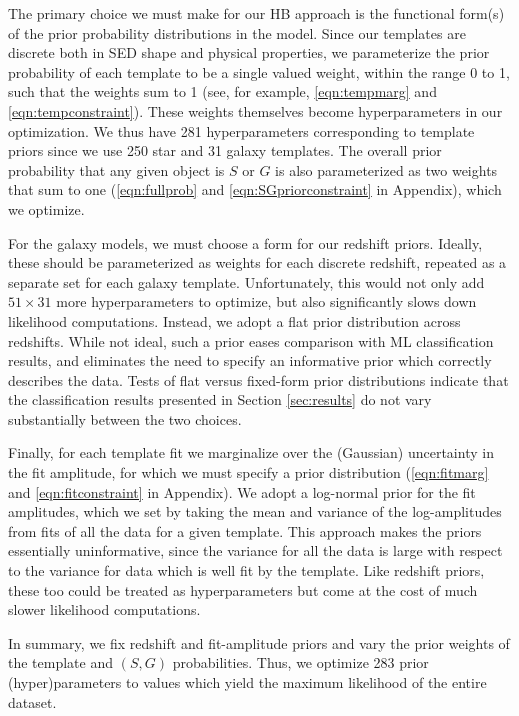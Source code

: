 \documentclass[12pt,preprint]{aastex}
\begin{document}
The primary choice we must make for our HB approach is the functional
form(s) of the prior probability distributions in the model.  Since
our templates are discrete both in SED shape and physical properties,
we parameterize the prior probability of each template to be a single
valued weight, within the range 0 to 1, such that the weights sum to
1 (see, for example, \ref{eqn:tempmarg} and \ref{eqn:tempconstraint}).  
These weights themselves become hyperparameters in our
optimization.  We thus have 281 hyperparameters corresponding to
template priors since we use 250 star and 31 galaxy templates.  The
overall prior probability that any given object is $S$ or $G$ is also
parameterized as two weights that sum to one (\ref{eqn:fullprob} and 
\ref{eqn:SGpriorconstraint} in Appendix), which we optimize.

For the galaxy models, we must choose a form for our redshift priors.  Ideally,
these should be parameterized as weights for each discrete redshift,
repeated as a separate set for each galaxy template.  Unfortunately,
this would not only add $51\times31$ more hyperparameters to optimize,
but also significantly slows down likelihood computations.  Instead,
we adopt a flat prior distribution across redshifts.  While not ideal,
such a prior eases comparison with ML classification results, and
eliminates the need to specify an informative prior which correctly
describes the data.  Tests of flat versus fixed-form prior
distributions indicate that the classification results presented in
Section \ref{sec:results} do not vary substantially between the two
choices.  

Finally, for each template fit we marginalize over the (Gaussian) uncertainty 
in the fit amplitude, for which we must specify a prior distribution 
(\ref{eqn:fitmarg} and \ref{eqn:fitconstraint} in Appendix).  We adopt a log-normal 
prior for the fit amplitudes, which we set by taking the mean and variance 
of the log-amplitudes from fits of all the data for a given template.  This approach makes 
the priors essentially uninformative, since the variance for all the data is 
large with respect to the variance for data which is well fit by the template.
Like redshift priors, these too could be treated as hyperparameters but come 
at the cost of much slower likelihood computations.  

In summary, we fix redshift and fit-amplitude priors and vary the prior weights 
of the template and $(S,G)$ probabilities.  Thus, we optimize 283 prior
(hyper)parameters to values which yield the maximum likelihood of the entire 
dataset.
\end{document}
